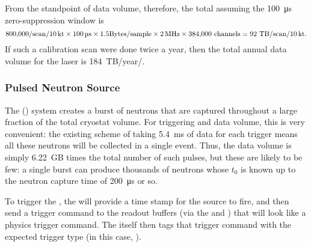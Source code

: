 From the standpoint of data volume, therefore, the total assuming the \SI{100}{\micro\s} zero-suppression window is
\begin{equation}
\num{800000}/{\rm scan}/\nominalmodsize \times \SI{100}{\micro\s} \times \num{1.5}{\rm Bytes/sample}\times \SI{2}{\mega\hertz}\times \num{384000}~{\rm channels}   = \num{92}~{\rm TB/scan/\nominalmodsize.}   
\end{equation}
If such a calibration scan were done twice a year, then the total annual data volume for the laser is \num{184}~TB/year/\nominalmodsize.

\subsubsection{Pulsed Neutron Source}

The  () system creates a burst of neutrons that
are captured throughout a large fraction of the total cryostat volume. For triggering and data volume, this is very convenient: the existing scheme of taking \SI{5.4}{\milli\s} of data for each trigger means all these neutrons will be collected in a single  event. Thus, the data volume is simply \num{6.22}~GB times the total number of such pulses, but these are likely to be few: a single burst can produce thousands of neutrons whose $t_0$ is known up to the neutron capture time of \SI{200}{\micro\s} or so.

To trigger the , the  will provide a time stamp for the source to fire, and then send a trigger command to the  readout buffers (via the  and ) that will look like a physics trigger command.  The  itself then tags that trigger command with the expected trigger type (in this case, ).

